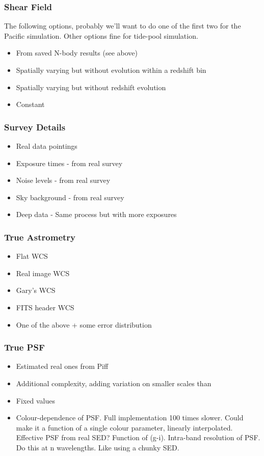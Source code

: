 \documentclass[\docopts]{\docclass}
\begin{document}
\subsubsection{Shear Field}

The following options, probably we'll want to do one of the first two for the Pacific simulation. Other options fine for tide-pool simulation. 
\begin{itemize}
\item From saved N-body results (see above)
\item Spatially varying but without evolution within a redshift bin
\item Spatially varying but without redshift evolution
\item Constant
\end{itemize}

\subsubsection{Survey Details}

\begin{itemize}
\item Real data pointings
\item Exposure times - from real survey
\item Noise levels - from real survey
\item Sky background - from real survey
\item Deep data - Same process but with more exposures
\end{itemize}


\subsubsection{True Astrometry}

\begin{itemize}
\item Flat WCS
\item Real image WCS
\item Gary's WCS
\item FITS header WCS
\item One of the above + some error distribution
\end{itemize}

\subsubsection{True PSF}

\begin{itemize}
\item Estimated real ones from Piff
\item Additional complexity, adding variation on smaller scales than 
\item Fixed values
\item Colour-dependence of PSF.
	  Full implementation 100 times slower.
	  Could make it a function of a single colour parameter, linearly interpolated.
	  Effective PSF from real SED? Function of (g-i).
	  Intra-band resolution of PSF.  Do this at n wavelengths.
	  Like using a chunky SED.
\end{itemize}
\end{document}
